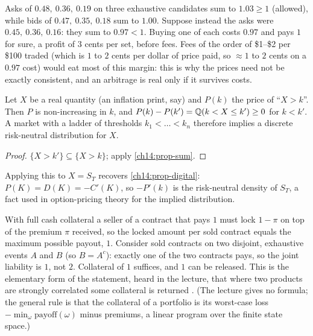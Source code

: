 \begin{paracol}{2}
\begin{example}\label{ch14:ex-three}
Asks of $0.48,\ 0.36,\ 0.19$ on three exhaustive candidates sum to $1.03\ge1$ (allowed), while bids of
$0.47,\ 0.35,\ 0.18$ sum to $1.00$. Suppose instead the asks were $0.45,\ 0.36,\ 0.16$: they sum to $0.97<1$. Buying one of each costs
$0.97$ and pays $1$ for sure, a profit of $3$ cents per set, before fees. Fees of the order of \$1--\$2 per \$100 traded
 (which is $1$ to $2$ cents per dollar of price paid, so $\approx 1$ to $2$ cents on a $0.97$ cost) would eat
most of this margin: this is why the prices need not be exactly consistent, and an arbitrage is real only if it survives
costs.
\end{example}

\begin{proposition}\label{ch14:prop-thresh}
Let $X$ be a real quantity (an inflation print, say) and $P(k)$ the price of ``$X>k$''. Then $P$ is non-increasing in $k$,
and $P(k)-P(k')=\mathbb{Q}(k<X\le k')\ge0$ for $k<k'$. A market with a ladder of thresholds $k_1<\dots<k_n$ therefore
implies a discrete risk-neutral distribution for $X$.
\end{proposition}
\begin{proof}
$\{X>k'\}\subseteq\{X>k\}$; apply \cref{ch14:prop-sum}.
\end{proof}

\begin{remark}
Applying this to $X=S_T$ recovers \cref{ch14:prop-digital}: $P(K)=D(K)=-C'(K)$, so $-P'(k)$ is the risk-neutral
density of $S_T$, a fact used in option-pricing theory for the implied distribution.
\end{remark}

\begin{finance}\label{ch14:fin-margin}
With full cash collateral a seller of a contract that pays $1$ must lock $1-\pi$ on top of the premium $\pi$ received, so the locked
amount per sold contract equals the maximum possible payout, $1$. Consider sold contracts on two disjoint,
exhaustive events $A$ and $B$ (so $B=A^c$): exactly one of the two contracts pays, so the joint liability is $1$, not $2$.
Collateral of $1$ suffices, and $1$ can be released. This is the elementary form of the statement, heard in the lecture, that where two
products are strongly correlated some collateral is returned . (The lecture gives no formula; the general
rule is that the collateral of a portfolio is its worst-case loss $-\min_\omega \text{payoff}(\omega)$ minus premiums, a linear
program over the finite state space.)
\end{finance}


\end{paracol}
